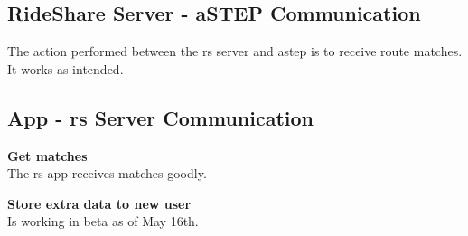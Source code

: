 \subsection{RideShare Server - aSTEP Communication}
The action performed between the \gls{rs} server and \gls{astep} is to receive route matches.
It works as intended.


\subsection{App - \gls{rs} Server Communication}
\textbf{Get matches}\\
The \gls{rs} app receives matches goodly.

\textbf{Store extra data to new user}\\
Is working in beta as of May 16th.
\fi
